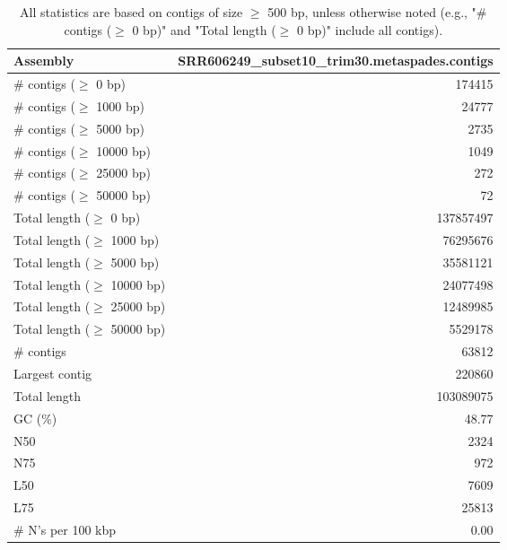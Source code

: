 \documentclass[12pt,a4paper]{article}
\begin{document}
\begin{table}[ht]
\begin{center}
\caption{All statistics are based on contigs of size $\geq$ 500 bp, unless otherwise noted (e.g., "\# contigs ($\geq$ 0 bp)" and "Total length ($\geq$ 0 bp)" include all contigs).}
\begin{tabular}{|l*{1}{|r}|}
\hline
Assembly & SRR606249\_subset10\_trim30.metaspades.contigs \\ \hline
\# contigs ($\geq$ 0 bp) & 174415 \\ \hline
\# contigs ($\geq$ 1000 bp) & 24777 \\ \hline
\# contigs ($\geq$ 5000 bp) & 2735 \\ \hline
\# contigs ($\geq$ 10000 bp) & 1049 \\ \hline
\# contigs ($\geq$ 25000 bp) & 272 \\ \hline
\# contigs ($\geq$ 50000 bp) & 72 \\ \hline
Total length ($\geq$ 0 bp) & 137857497 \\ \hline
Total length ($\geq$ 1000 bp) & 76295676 \\ \hline
Total length ($\geq$ 5000 bp) & 35581121 \\ \hline
Total length ($\geq$ 10000 bp) & 24077498 \\ \hline
Total length ($\geq$ 25000 bp) & 12489985 \\ \hline
Total length ($\geq$ 50000 bp) & 5529178 \\ \hline
\# contigs & 63812 \\ \hline
Largest contig & 220860 \\ \hline
Total length & 103089075 \\ \hline
GC (\%) & 48.77 \\ \hline
N50 & 2324 \\ \hline
N75 & 972 \\ \hline
L50 & 7609 \\ \hline
L75 & 25813 \\ \hline
\# N's per 100 kbp & 0.00 \\ \hline
\end{tabular}
\end{center}
\end{table}
\end{document}
